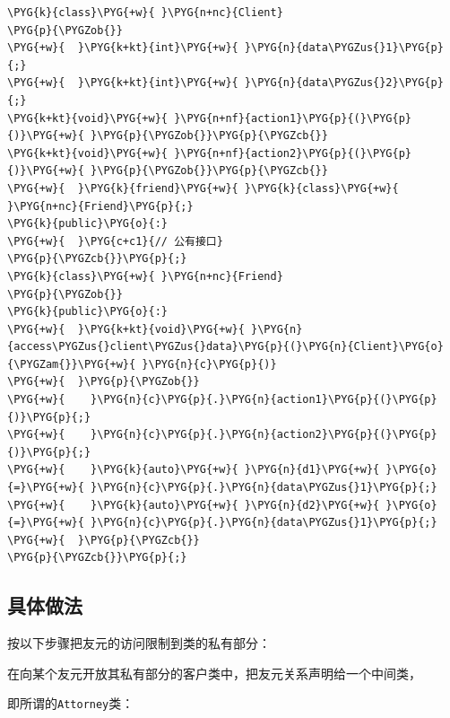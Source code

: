 \begin{codeblockbg}
\begin{Verbatim}[commandchars=\\\{\},breaklines=true,breakanywhere=true,fontsize=\codefont,xleftmargin=17bp]
\PYG{k}{class}\PYG{+w}{ }\PYG{n+nc}{Client}
\PYG{p}{\PYGZob{}}
\PYG{+w}{  }\PYG{k+kt}{int}\PYG{+w}{ }\PYG{n}{data\PYGZus{}1}\PYG{p}{;}
\PYG{+w}{  }\PYG{k+kt}{int}\PYG{+w}{ }\PYG{n}{data\PYGZus{}2}\PYG{p}{;}
\PYG{k+kt}{void}\PYG{+w}{ }\PYG{n+nf}{action1}\PYG{p}{(}\PYG{p}{)}\PYG{+w}{ }\PYG{p}{\PYGZob{}}\PYG{p}{\PYGZcb{}}
\PYG{k+kt}{void}\PYG{+w}{ }\PYG{n+nf}{action2}\PYG{p}{(}\PYG{p}{)}\PYG{+w}{ }\PYG{p}{\PYGZob{}}\PYG{p}{\PYGZcb{}}
\PYG{+w}{  }\PYG{k}{friend}\PYG{+w}{ }\PYG{k}{class}\PYG{+w}{ }\PYG{n+nc}{Friend}\PYG{p}{;}
\PYG{k}{public}\PYG{o}{:}
\PYG{+w}{  }\PYG{c+c1}{// 公有接口}
\PYG{p}{\PYGZcb{}}\PYG{p}{;}
\PYG{k}{class}\PYG{+w}{ }\PYG{n+nc}{Friend}
\PYG{p}{\PYGZob{}}
\PYG{k}{public}\PYG{o}{:}
\PYG{+w}{  }\PYG{k+kt}{void}\PYG{+w}{ }\PYG{n}{access\PYGZus{}client\PYGZus{}data}\PYG{p}{(}\PYG{n}{Client}\PYG{o}{\PYGZam{}}\PYG{+w}{ }\PYG{n}{c}\PYG{p}{)}
\PYG{+w}{  }\PYG{p}{\PYGZob{}}
\PYG{+w}{    }\PYG{n}{c}\PYG{p}{.}\PYG{n}{action1}\PYG{p}{(}\PYG{p}{)}\PYG{p}{;}
\PYG{+w}{    }\PYG{n}{c}\PYG{p}{.}\PYG{n}{action2}\PYG{p}{(}\PYG{p}{)}\PYG{p}{;}
\PYG{+w}{    }\PYG{k}{auto}\PYG{+w}{ }\PYG{n}{d1}\PYG{+w}{ }\PYG{o}{=}\PYG{+w}{ }\PYG{n}{c}\PYG{p}{.}\PYG{n}{data\PYGZus{}1}\PYG{p}{;}
\PYG{+w}{    }\PYG{k}{auto}\PYG{+w}{ }\PYG{n}{d2}\PYG{+w}{ }\PYG{o}{=}\PYG{+w}{ }\PYG{n}{c}\PYG{p}{.}\PYG{n}{data\PYGZus{}1}\PYG{p}{;}
\PYG{+w}{  }\PYG{p}{\PYGZcb{}}
\PYG{p}{\PYGZcb{}}\PYG{p}{;}
\end{Verbatim}
\end{codeblockbg}



\subsection{具体做法}



按以下步骤把友元的访问限制到类的私有部分：



在向某个友元开放其私有部分的客户类中，把友元关系声明给一个中间类，



即所谓的\texttt{Attorney}类：



